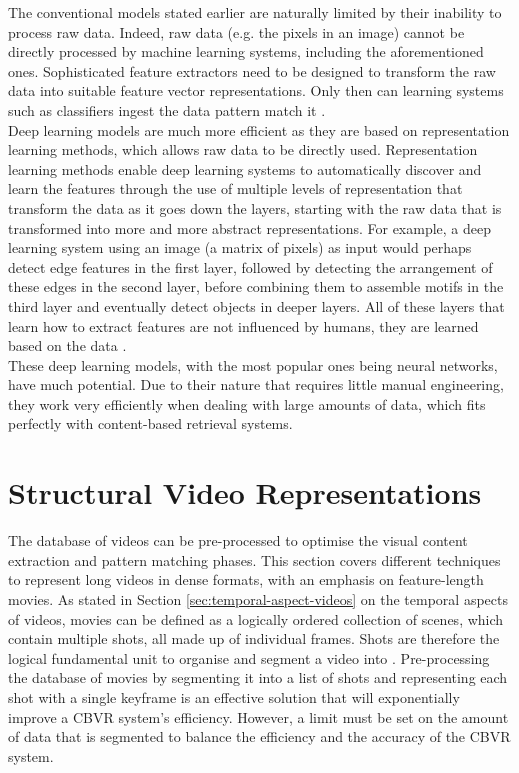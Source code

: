 The conventional models stated earlier are naturally limited by their inability to process raw data. Indeed, raw data (e.g. the pixels in an image) cannot be directly processed by machine learning systems, including the aforementioned ones. Sophisticated feature extractors need to be designed to transform the raw data into suitable feature vector representations. Only then can learning systems such as classifiers ingest the data pattern match it \cite{lecun2015deeplearning}.\\

Deep learning models are much more efficient as they are based on representation learning methods, which allows raw data to be directly used. Representation learning methods enable deep learning systems to automatically discover and learn the features through the use of multiple levels of representation that transform the data as it goes down the layers, starting with the raw data that is transformed into more and more abstract representations. For example, a deep learning system using an image (a matrix of pixels) as input would perhaps detect edge features in the first layer, followed by detecting the arrangement of these edges in the second layer, before combining them to assemble motifs in the third layer and eventually detect objects in deeper layers. All of these layers that learn how to extract features are not influenced by humans, they are learned based on the data \cite{lecun2015deeplearning}.\\

These deep learning models, with the most popular ones being neural networks, have much potential. Due to their nature that requires little manual engineering, they work very efficiently when dealing with large amounts of data, which fits perfectly with content-based retrieval systems.

\section{Structural Video Representations}
\label{sec:movie-pre-processing}

The database of videos can be pre-processed to optimise the visual content extraction and pattern matching phases. This section covers different techniques to represent long videos in dense formats, with an emphasis on feature-length movies. As stated in Section \ref{sec:temporal-aspect-videos} on the temporal aspects of videos, movies can be defined as a logically ordered collection of scenes, which contain multiple shots, all made up of individual frames. Shots are therefore the logical fundamental unit to organise and segment a video into \cite{hu2011survey}. Pre-processing the database of movies by segmenting it into a list of shots and representing each shot with a single keyframe is an effective solution that will exponentially improve a CBVR system's efficiency. However, a limit must be set on the amount of data that is segmented to balance the efficiency and the accuracy of the CBVR system.

